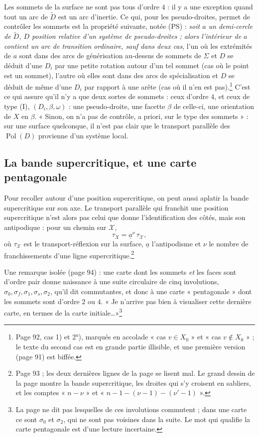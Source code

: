 \documentclass[11pt,a4paper]{article}
\begin{document}
Les sommets de la surface ne sont pas tous d'ordre $4$ : il y a une exception
quand tout un arc de $\widetilde{D}$ est un arc d'inertie. Ce qui, pour les
pseudo-droites, permet de contrôler les sommets est la propriété suivante, notée
(PS) : \emph{soit $a$ un demi-cercle de $\widetilde{D}$, $D$ position relative
d'un système de pseudo-droites ; alors l'intérieur de $a$ contient un arc de
transition ordinaire, sauf dans deux cas}, l'un où les extrémités de $a$ sont
dans des arcs de générisation au-dessus de sommets de $\Sigma$ et $D$ se déduit
d'une $D_i$ par une petite rotation autour d'un tel sommet (cas où le point est
un sommet), l'autre où elles sont dans des arcs de spécialisation et $D$ se
déduit de même d'une $D_i$ par rapport à une arête (cas où il n'en est
pas).\footnote{Page 92, cas 1) et 2°), marqués en accolade « cas $v \in X_0$ »
et « cas $v \notin X_0$ » ; le texte du second cas est en grande partie
illisible, et une première version (page 91) est biffée.} C'est ce qui assure
qu'il n'y a que deux sortes de sommets : ceux d'ordre $4$, et ceux de type (I),
$(D_i, \beta, \omega)$ : une pseudo-droite, une facette $\beta$ de celle-ci, une
orientation de $X$ en $\beta$. « Sinon, on n'a pas de contrôle, a priori, sur
le type des sommets » : sur une surface quelconque, il n'est pas clair que le
transport parallèle des $\operatorname{Pol}(D)$ provienne d'un système local.

\subsection*{La bande supercritique, et une carte pentagonale}

Pour recoller autour d'une position supercritique, on peut aussi aplatir la bande
supercritique sur son axe. Le transport parallèle qui franchit une position
supercritique n'est alors pas celui que donne l'identification des côtés, mais
son antipodique : pour un chemin sur $\mathcal{X}$,
\[
\tau_X = \underline{a}^{\nu}\,\tau_{\mathcal{X}} ,
\]
où $\tau_{\mathcal{X}}$ est le transport-réflexion sur la surface,
$\underline{a}$ l'antipodisme et $\nu$ le nombre de franchissements d'une
ligne supercritique.\footnote{Page 93 ; les deux dernières lignes de la page se
lisent mal. Le grand dessin de la page montre la bande supercritique, les
droites qui s'y croisent en sabliers, et les comptes « $n - \nu$ » et « $n - 1 -
(\nu - 1) - (\nu' - 1)$ ».}

Une remarque isolée (page 94) : une carte dont les sommets \emph{et} les faces
sont d'ordre pair donne naissance à une suite circulaire de cinq involutions,
$\sigma_0, \sigma_f, \sigma_1, \sigma_s, \sigma_2$, qu'il dit commutantes, et
donc à une carte « pentagonale » dont les sommets sont d'ordre $2$ ou $4$. « Je
n'arrive pas bien à visualiser cette dernière carte, en termes de la carte
initiale\ldots »\footnote{La page ne dit pas lesquelles de ces involutions
commutent ; dans une carte ce sont $\sigma_0$ et $\sigma_2$, qui ne sont pas
voisines dans la suite. Le mot qui qualifie la carte pentagonale est d'une
lecture incertaine.}
\end{document}
